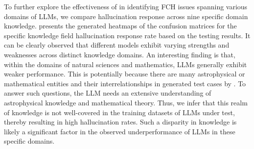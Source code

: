 To further explore the effectiveness of \tool in identifying FCH issues spanning various domains of LLMs, we compare hallucination response across nine specific domain knowledge. 
 presents the generated heatmaps of the confusion matrices for the specific knowledge field hallucination response rate based on the testing results.
It can be clearly observed that different models exhibit varying strengths and weaknesses across distinct knowledge domains. 
An interesting finding is that, within the domains of natural sciences and mathematics, LLMs generally exhibit weaker performance. This is potentially because there are many astrophysical or mathematical entities and their interrelationships in generated test cases by \tool. To answer such questions, the LLM needs an extensive understanding of astrophysical knowledge and mathematical theory. Thus, we infer that this realm of knowledge is not well-covered in the training datasets of LLMs under test, thereby resulting in high hallucination rates. Such a disparity in knowledge is likely a significant factor in the observed underperformance of LLMs in these specific domains.



